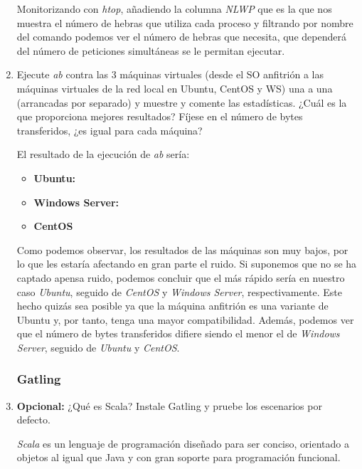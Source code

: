 \documentclass[paper=a4, fontsize=11pt]{scrartcl} %
\numberwithin{equation}{section} %
\numberwithin{figure}{section} %
\numberwithin{table}{section} %
\begin{document}
\begin{enumerate}
		Monitorizando con \textit{htop}\cite{man_htop}, añadiendo la columna \textit{NLWP} que es la
		que nos muestra el número de hebras que utiliza cada proceso y filtrando por nombre del comando
		podemos ver el número de hebras que necesita, que dependerá del número de peticiones simultáneas
		se le permitan ejecutar.
		
		\item Ejecute \textit{ab} contra las 3 máquinas virtuales (desde el SO anfitrión a las máquinas
		virtuales de la red local en Ubuntu, CentOS y WS) una a una (arrancadas por separado) y muestre
		y comente las estadísticas. ¿Cuál es la que proporciona mejores resultados? Fíjese en el número
		de bytes transferidos, ¿es igual para cada máquina?
		
		El resultado de la ejecución de \textit{ab} sería:
		
		\begin{itemize}
			\item \textbf{Ubuntu:}
			
			
			\item \textbf{Windows Server:}
			
			
			\item \textbf{CentOS}
			
		\end{itemize}
		
		Como podemos observar, los resultados de las máquinas son muy bajos, por lo que les estaría
		afectando en gran parte el ruido. Si suponemos que no se ha captado apensa ruido, podemos
		concluir que el más rápido sería en nuestro caso \textit{Ubuntu}, seguido de \textit{CentOS}
		y \textit{Windows Server}, respectivamente. Este hecho quizás sea posible ya que la máquina
		anfitrión es una variante de Ubuntu y, por tanto, tenga una mayor compatibilidad. Además,
		podemos ver que el número de bytes transferidos difiere siendo el menor el de \textit{Windows
		Server}, seguido de \textit{Ubuntu} y \textit{CentOS}.
		
	\subsubsection{Gatling}
		\item \textbf{Opcional:} ¿Qué es Scala? Instale Gatling y pruebe los escenarios por defecto.
		
		\textit{Scala}\cite{Scala} es un lenguaje de programación diseñado para ser conciso, orientado
		a objetos al igual que Java y con gran soporte para programación funcional.
		

\end{enumerate}
\end{document}
